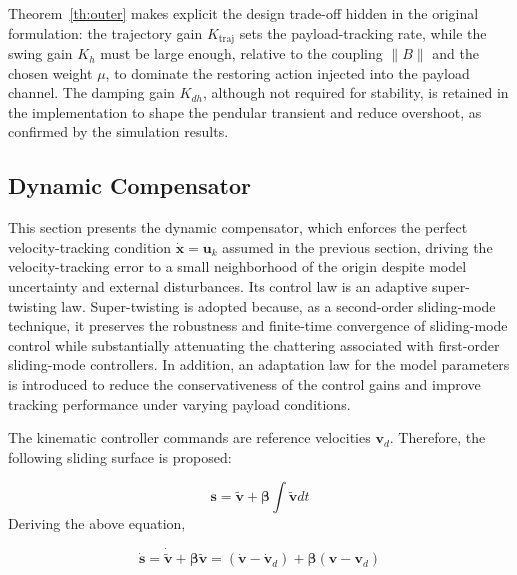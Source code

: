 \documentclass[sn-mathphys-num]{sn-jnl}
\theoremstyle{thmstyleone}%
\theoremstyle{thmstyletwo}%
\theoremstyle{thmstylethree}%
\begin{document}
\noindent
Theorem~\ref{th:outer} makes explicit the design trade-off hidden in the original
formulation: the trajectory gain $K_{\mathrm{traj}}$ sets the payload-tracking rate,
while the swing gain $K_h$ must be large enough, relative to the coupling $\|B\|$ and
the chosen weight $\mu$, to dominate the restoring action injected into the payload
channel. The damping gain $K_{dh}$, although not required for stability, is retained in
the implementation to shape the pendular transient and reduce overshoot, as confirmed
by the simulation results.

\subsection{Dynamic Compensator}\label{sec:dynamic}

This section presents the dynamic compensator, which enforces the perfect velocity-tracking condition $\dot{\mathbf{x}}=\mathbf{u}_k$ assumed in the previous section, driving the velocity-tracking error to a small neighborhood of the origin despite model uncertainty and external disturbances. Its control law is an adaptive super-twisting law. Super-twisting is adopted because, as a second-order sliding-mode technique, it preserves the robustness and finite-time convergence of sliding-mode control while substantially attenuating the chattering associated with first-order sliding-mode controllers. In addition, an adaptation law for the model parameters is introduced to reduce the conservativeness of the control gains and improve tracking performance under varying payload conditions.


The kinematic controller commands are reference velocities $\mathbf{v}_d$. Therefore, the following sliding surface is proposed:

\begin{equation}
    \mathbf{s} = \tilde{\mathbf{v}} + \boldsymbol{\beta}\int \tilde{\mathbf{v}} dt
\end{equation}
Deriving the above equation,

\begin{equation}
    \dot{\mathbf{s}} = \dot{\tilde{\mathbf{v}}} + \boldsymbol{\beta} \tilde{\mathbf{v}} = (\dot{\mathbf{v}} - \dot{\mathbf{v}}_d) + \boldsymbol{\beta}(\mathbf{v} - \mathbf{v}_d)
\end{equation}
\end{document}
